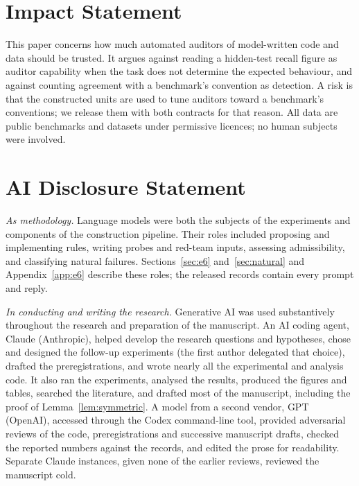 \documentclass{article}
\begin{document}








\section*{Impact Statement}
This paper concerns how much automated auditors of model-written code and data should be trusted. It argues
against reading a hidden-test recall figure as auditor capability when the task does not determine the expected
behaviour, and against counting agreement with a benchmark's convention as detection. A risk is that the
constructed units are used to tune auditors toward a benchmark's conventions; we release them with both contracts
for that reason. All data are public benchmarks and datasets under permissive licences; no human subjects were
involved.

\section*{AI Disclosure Statement}

\emph{As methodology.} Language models were both the subjects of the
experiments and components of the construction pipeline. Their roles
included proposing and implementing rules, writing probes and red-team
inputs, assessing admissibility, and classifying natural failures.
Sections~\ref{sec:e6} and~\ref{sec:natural} and Appendix~\ref{app:e6}
describe these roles; the released records contain every prompt and reply.

\emph{In conducting and writing the research.} Generative AI was used
substantively throughout the research and preparation of the manuscript.
An AI coding agent, Claude (Anthropic), helped develop the research
questions and hypotheses, chose and designed the follow-up experiments (the first author delegated that choice), drafted the
preregistrations, and wrote nearly all the experimental and analysis
code. It also ran the experiments, analysed the results, produced the
figures and tables, searched the literature, and drafted most of the
manuscript, including the proof of Lemma~\ref{lem:symmetric}. A model
from a second vendor, GPT (OpenAI), accessed through the Codex
command-line tool, provided adversarial reviews of the code,
preregistrations and successive manuscript drafts, checked the reported
numbers against the records, and edited the prose for readability. Separate Claude instances, given none of the
earlier reviews, reviewed the manuscript cold.
\end{document}

